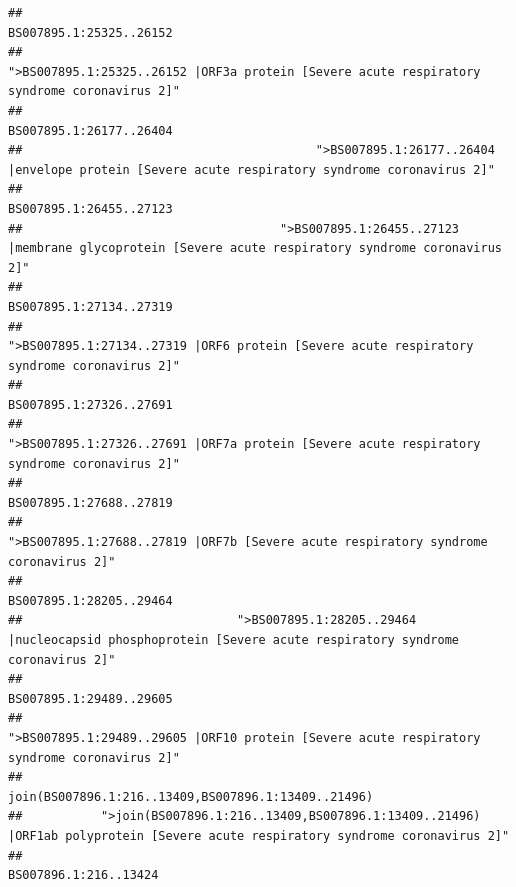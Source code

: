 \documentclass[
]{article}
\begin{document}
\begin{verbatim}
##                                                                                                                BS007895.1:25325..26152 
##                                            ">BS007895.1:25325..26152 |ORF3a protein [Severe acute respiratory syndrome coronavirus 2]" 
##                                                                                                                BS007895.1:26177..26404 
##                                         ">BS007895.1:26177..26404 |envelope protein [Severe acute respiratory syndrome coronavirus 2]" 
##                                                                                                                BS007895.1:26455..27123 
##                                    ">BS007895.1:26455..27123 |membrane glycoprotein [Severe acute respiratory syndrome coronavirus 2]" 
##                                                                                                                BS007895.1:27134..27319 
##                                             ">BS007895.1:27134..27319 |ORF6 protein [Severe acute respiratory syndrome coronavirus 2]" 
##                                                                                                                BS007895.1:27326..27691 
##                                            ">BS007895.1:27326..27691 |ORF7a protein [Severe acute respiratory syndrome coronavirus 2]" 
##                                                                                                                BS007895.1:27688..27819 
##                                                    ">BS007895.1:27688..27819 |ORF7b [Severe acute respiratory syndrome coronavirus 2]" 
##                                                                                                                BS007895.1:28205..29464 
##                              ">BS007895.1:28205..29464 |nucleocapsid phosphoprotein [Severe acute respiratory syndrome coronavirus 2]" 
##                                                                                                                BS007895.1:29489..29605 
##                                            ">BS007895.1:29489..29605 |ORF10 protein [Severe acute respiratory syndrome coronavirus 2]" 
##                                                                                    join(BS007896.1:216..13409,BS007896.1:13409..21496) 
##           ">join(BS007896.1:216..13409,BS007896.1:13409..21496) |ORF1ab polyprotein [Severe acute respiratory syndrome coronavirus 2]" 
##                                                                                                                  BS007896.1:216..13424 

\end{verbatim}
\end{document}
